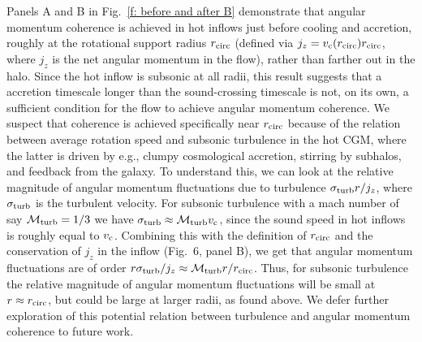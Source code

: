 \documentclass[fleqn,usenatbib]{mnras}
\newcommand{\Rcirc}[0]{r_{\rm circ}}
\newcommand{\vc}[0]{v_{\rm c}}
\newcommand{\mturb}[0]{\mathcal{M}_{\rm turb}}
\begin{document}
Panels A and B in Fig.~\ref{f: before and after B} demonstrate that angular momentum coherence is achieved in hot inflows just before cooling and accretion, roughly at the rotational support radius $\Rcirc$ (defined via $j_z=\vc(\Rcirc)\Rcirc$, where $j_z$ is the net angular momentum in the flow),  rather than farther out in the halo.
Since the hot inflow is subsonic at all radii, this result suggests that a accretion timescale longer than the sound-crossing timescale is not, on its own, a sufficient condition for the flow to achieve angular momentum coherence.
We suspect that coherence is achieved specifically near $\Rcirc$ because of the relation between average rotation speed and subsonic turbulence in the hot CGM, where the latter is driven by e.g., clumpy cosmological accretion, stirring by subhalos, and feedback from the galaxy.
To understand this, we can look at the relative magnitude of angular momentum fluctuations due to turbulence $\sigma_{\rm turb} r / j_z$, where $\sigma_{\rm turb}$ is the turbulent velocity.
For subsonic turbulence with a mach number of say $\mturb=1/3$ we have $\sigma_{\rm turb}\approx \mturb\vc$, since the sound speed in hot inflows is roughly equal to $\vc$.
Combining this with the definition of $\Rcirc$ and the conservation of $j_z$ in the inflow (Fig.~6, panel B), we get that angular momentum fluctuations are of order $r \sigma_{\rm turb}/j_z \approx \mturb r/ \Rcirc$.
Thus, for subsonic turbulence the relative magnitude of angular momentum fluctuations will be small at $r\approx\Rcirc$, but could be large at larger radii, as found above.
We defer further exploration of this potential relation between turbulence and angular momentum coherence to future work. 
\end{document}
